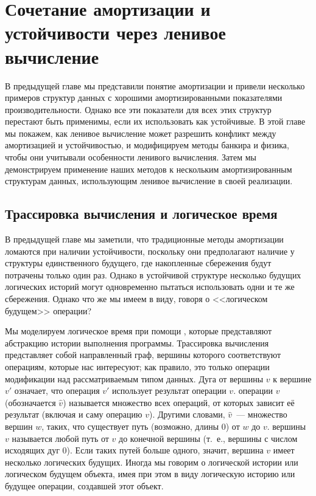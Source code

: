 \chapter{Сочетание амортизации и устойчивости через ленивое
  вычисление}
\label{ch:6}

В предыдущей главе мы представили понятие амортизации и привели
несколько примеров структур данных с хорошими амортизированными
показателями производительности. Однако все эти показатели для всех этих
структур перестают быть применимы, если их использовать как
устойчивые. В этой главе мы покажем, как ленивое вычисление может
разрешить конфликт между амортизацией и устойчивостью, и модифицируем
методы банкира и физика, чтобы они учитывали особенности ленивого
вычисления. Затем мы демонстрируем применение наших методов к
нескольким амортизированным структурам данных, использующим ленивое
вычисление в своей реализации.

\section{Трассировка вычисления и логическое время}
\label{sc:6.1}

В предыдущей главе мы заметили, что традиционные методы амортизации
ломаются при наличии устойчивости, поскольку они предполагают наличие
у структуры единственного будущего, где накопленные сбережения будут
потрачены только один раз. Однако в устойчивой структуре несколько
будущих логических историй могут одновременно пытаться
использовать одни и те же сбережения. Однако что же мы имеем в виду,
говоря о <<логическом будущем>> операции?

Мы моделируем логическое время при помощи , которые представляют абстракцию
истории выполнения программы. Трассировка вычисления представляет собой
направленный граф, вершины которого соответствуют операциям, которые
нас интересуют; как правило, это только операции модификации над
рассматриваемым типом данных. Дуга от вершины $v$ к вершине $v'$
означает, что операция $v'$ использует результат операции
$v$.  операции $v$
(обозначается $\hat{v}$) называется
множество всех операций, от которых зависит её результат (включая и
саму операцию $v$). Другими словами, $\hat{v}$~--- множество вершин
$w$, таких, что существует путь (возможно, длины 0) от $w$ до $v$. 
 вершины $v$ называется любой
путь от $v$ до конечной вершины (т.~е., вершины с числом исходящих дуг
0). Если таких путей больше одного, значит, вершина $v$ имеет
несколько логических будущих. Иногда мы говорим о логической истории
или логическом будущем объекта, имея при этом в виду логическую
историю или будущее операции, создавшей этот объект.

